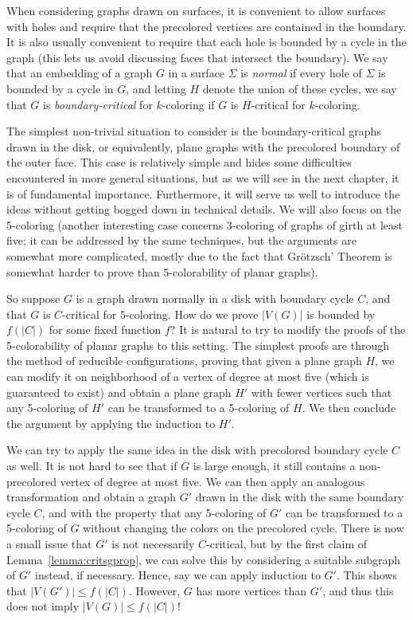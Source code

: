 \documentclass[12pt,twoside,openright,a4paper]{book}
\begin{document}
When considering graphs drawn on surfaces, it is convenient to allow surfaces with holes and require that the precolored
vertices are contained in the boundary.  It is also usually convenient to require that each hole is bounded by a cycle
in the graph (this lets us avoid discussing faces that intersect the boundary).  We say that an embedding of a graph
$G$ in a surface $\Sigma$ is \emph{normal} if every hole of $\Sigma$ is bounded by a cycle in $G$,
and letting $H$ denote the union of these cycles, we say that $G$ is \emph{boundary-critical} for $k$-coloring
if $G$ is $H$-critical for $k$-coloring.

The simplest non-trivial situation to consider is the boundary-critical graphs drawn in the disk, or equivalently,
plane graphs with the precolored boundary of the outer face.  This case is relatively simple and hides some difficulties
encountered in more general situations, but as we will see in the next chapter, it is of fundamental importance.
Furthermore, it will serve us well to introduce the ideas without getting bogged down in technical details.
We will also focus on the 5-coloring (another interesting case concerns 3-coloring of graphs of girth at least five;
it can be addressed by the same techniques, but the arguments are somewhat more complicated, mostly due to the
fact that Gr\"otzsch' Theorem is somewhat harder to prove than 5-colorability of planar graphs).

So suppose $G$ is a graph drawn normally in a disk with boundary cycle $C$, and that $G$ is $C$-critical for $5$-coloring.
How do we prove $|V(G)|$ is bounded by $f(|C|)$ for some fixed function $f$?  It is natural to try to modify the proofs of the 5-colorability
of planar graphs to this setting.  The simplest proofs are through the method of reducible configurations, proving
that given a plane graph $H$, we can modify it on neighborhood of a vertex of degree at most five (which is guaranteed to exist)
and obtain a plane graph $H'$ with fewer vertices such that any 5-coloring of $H'$ can be transformed to a 5-coloring of $H$.
We then conclude the argument by applying the induction to $H'$.

We can try to apply the same idea in the disk with precolored boundary cycle $C$ as well.  It is not hard to see that if $G$
is large enough, it still contains a non-precolored vertex of degree at most five.  We can then apply an analogous transformation
and obtain a graph $G'$ drawn in the disk with the same boundary cycle $C$, and with the property that any 5-coloring of $G'$
can be transformed to a 5-coloring of $G$ without changing the colors on the precolored cycle.  There is now a small issue
that $G'$ is not necessarily $C$-critical, but by the first claim of Lemma~\ref{lemma:critsgprop}, we can solve this
by considering a suitable subgraph of $G'$ instead, if necessary.  Hence, say we can apply induction to $G'$.
This shows that $|V(G')|\le f(|C|)$.  However, $G$ has more vertices than $G'$, and thus this does not imply $|V(G)|\le f(|C|)$!
\end{document}
